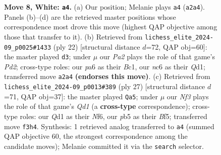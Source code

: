 \documentclass[11pt]{article}
\begin{document}
\begin{figure}[p]
\caption{\textbf{Move 8, White: \texttt{a4}.} (a) Our position; Melanie plays \texttt{a4} (\texttt{a2a4}). Panels (b)--(d) are the retrieved master positions whose correspondence most drove this move (highest QAP objective among those that transfer to it). (b) Retrieved from \texttt{lichess\_elite\_2024-09\_p0025\#1433} (ply 22) [structural distance $d$=72, QAP obj=60]: the master played \texttt{d3}; under $\mu$ our \emph{Pa2} plays the role of that game's \emph{Pd2}; cross-type roles: our \emph{p}a6 as their \emph{B}c1, our \emph{n}c6 as their \emph{Q}d1; transferred move \texttt{a2a4} \textbf{(endorses this move)}. (c) Retrieved from \texttt{lichess\_elite\_2024-09\_p0013\#389} (ply 27) [structural distance $d$=71, QAP obj=37]: the master played \texttt{Qa5}; under $\mu$ our \emph{Nf3} plays the role of that game's \emph{Qd1} (a \textbf{cross-type} correspondence); cross-type roles: our \emph{Q}d1 as their \emph{N}f6, our \emph{p}b5 as their \emph{B}f5; transferred move \texttt{f3h4}. Synthesis: 1 retrieved analog transferred to \texttt{a4} (summed QAP objective 60, the strongest correspondence among the candidate moves); Melanie committed it via the \texttt{search} selector.}
\label{fig:thought-m14}
\end{figure}

\clearpage
\end{document}

